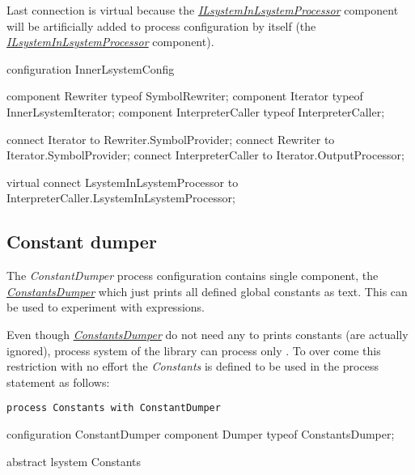 Last connection is virtual because the \hyperref[Malsys.Processing.Components.Common.ILsystemInLsystemProcessor]{\emph{ILsystemInLsystemProcessor}} component will be artificially added
	to process configuration by itself (the \hyperref[Malsys.Processing.Components.Common.ILsystemInLsystemProcessor]{\emph{ILsystemInLsystemProcessor}} component).


\begin{LsystemBreak}
configuration InnerLsystemConfig {
	component Rewriter typeof SymbolRewriter;
	component Iterator typeof InnerLsystemIterator;
	component InterpreterCaller typeof InterpreterCaller;

	connect Iterator to Rewriter.SymbolProvider;
	connect Rewriter to Iterator.SymbolProvider;
	connect InterpreterCaller to Iterator.OutputProcessor;
	
	virtual connect LsystemInLsystemProcessor
		to InterpreterCaller.LsystemInLsystemProcessor;
}
\end{LsystemBreak}


\subsection{Constant dumper}

The \emph{ConstantDumper} process configuration contains single component, the \hyperref[Malsys.Processing.Components.Common.ConstantsDumper]{\emph{ConstantsDumper}} which just prints all defined global constants as text.
This can be used to experiment with expressions.

Even though \hyperref[Malsys.Processing.Components.Common.ConstantsDumper]{\emph{ConstantsDumper}} do not need any \lsystems to prints constants (\lsystems are actually ignored), process system of the library can process only \lsystems.
To over come this restriction with no effort the \emph{Constants} \lsystem is defined to be used in the process statement as follows:

\noindent
\texttt{process Constants with ConstantDumper}

\begin{LsystemBreak}
configuration ConstantDumper {
	component Dumper typeof ConstantsDumper;
}

abstract lsystem Constants { }
\end{LsystemBreak}



